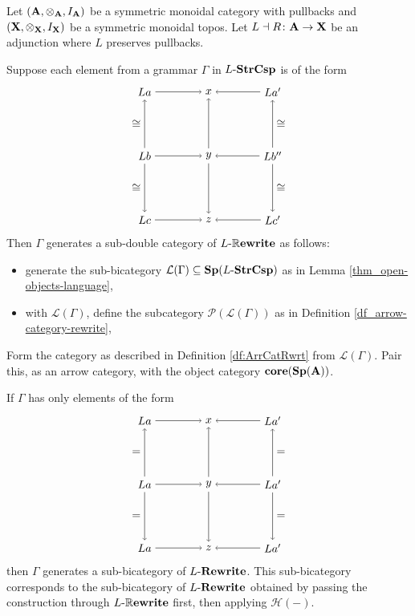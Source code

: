 \documentclass{amsart}
\begin{document}
\begin{thm} \label{thm_}
	Let $ (\mathbf{A} , \otimes_{\mathbf{A}} , I_{\mathbf{A}}) $ be a symmetric monoidal category with pullbacks and $ (\mathbf{X} , \otimes_{\mathbf{X}} , I_{\mathbf{X}}) $ be a symmetric monoidal topos.  Let $ L \dashv R \colon \mathbf{A} \to \mathbf{X} $ be an adjunction where $ L $ preserves pullbacks.
	
	Suppose each element from a grammar $ \Gamma $ in $ L \text{-} \mathbf{StrCsp} $ is of the form 
	\[
	\begin{tikzpicture}
	\node (a) at (-1,1) {$ L a $};
	\node (x) at (1,1) {$ x $};
	\node (a') at (3,1) {$ L a' $};
	\node (b) at (-1,-1) {$ L b $};
	\node (y) at (1,-1) {$ y $};
	\node (b') at (3,-1) {$ L b'' $};
	\node (c) at (-1,-3) {$ L c $};
	\node (z) at (1,-3) {$ z $};
	\node (c') at (3,-3) {$ L c' $};
	\draw [->] (a) to (x);
	\draw [->] (a') to (x);
	\draw [->] (b) to (y);
	\draw [->] (b') to (y);
	\draw [->] (c) to (z);
	\draw [->] (c') to (z);
	\draw [->] (b) to node [left] {$ \cong $} (a);
	\draw [->] (b) to node [left] {$ \cong $} (c);
	\draw [->] (y) to (x);
	\draw [->] (y) to (z);
	\draw [->] (b') to node [right] {$ \cong $} (a');
	\draw [->] (b') to node [right] {$ \cong $} (c');
	\end{tikzpicture}
	\]
	Then $ \Gamma $ generates a sub-double category of $ L \text{-} \mathbb{R}\mathbf{ewrite} $ as follows:
	\begin{itemize}
		\item generate the sub-bicategory $ \mathcal{L}(\Gamma)  \subseteq \mathbf{Sp}(L \text{-} \mathbf{StrCsp}) $ as in Lemma \ref{thm_open-objects-language}, 
		\item with $ \mathcal{L}(\Gamma) $, define the subcategory $ \mathcal{P}(\mathcal{L}(\Gamma)) $ as in Definition \ref{df_arrow-category-rewrite},
	\end{itemize}  
	
	Form the category as described in Definition \ref{df:ArrCatRwrt} from $ \mathcal{L}(\Gamma) $. Pair this, as an arrow category, with the object category $ \mathbf{core}(\mathbf{Sp}(\mathbf{A})) $.  
\end{thm}

\begin{thm}
	If $ \Gamma $ has only elements of the form 
	\[
	\begin{tikzpicture}
	\node (a) at (-1,1) {$ L a $};
	\node (x) at (1,1) {$ x $};
	\node (a') at (3,1) {$ L a' $};
	\node (b) at (-1,-1) {$ L a $};
	\node (y) at (1,-1) {$ y $};
	\node (b') at (3,-1) {$ L a' $};
	\node (c) at (-1,-3) {$ L a $};
	\node (z) at (1,-3) {$ z $};
	\node (c') at (3,-3) {$ L a' $};
	\draw [->] (a) to (x);
	\draw [->] (a') to (x);
	\draw [->] (b) to (y);
	\draw [->] (b') to (y);
	\draw [->] (c) to (z);
	\draw [->] (c') to (z);
	\draw [->] (b) to node [left] {$ = $} (a);
	\draw [->] (b) to node [left] {$ = $} (c);
	\draw [->] (y) to (x);
	\draw [->] (y) to (z);
	\draw [->] (b') to node [right] {$ = $} (a');
	\draw [->] (b') to node [right] {$ = $} (c');
	\end{tikzpicture}
	\]
	then $ \Gamma $ generates a sub-bicategory of $ L \text{-} \mathbf{Rewrite} $.  This sub-bicategory corresponds to the sub-bicategory of $ L \text{-} \mathbf{Rewrite} $ obtained by passing the construction through $ L \text{-} \mathbb{R}\mathbf{ewrite} $ first, then applying $ \mathcal{H}(-) $.  
\end{thm}
\end{document}
